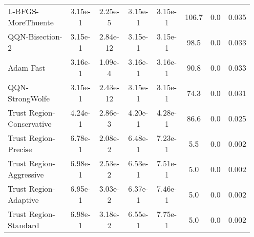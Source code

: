 \documentclass{article}
\begin{document}
\begin{table}[htbp]
{\begin{tabular}{p{2.5cm}*{7}{c}}
L-BFGS-MoreThuente & 3.15e-1 & 2.25e-5 & 3.15e-1 & 3.15e-1 & 106.7 & 0.0 & 0.035 \\
QQN-Bisection-2 & 3.15e-1 & 2.84e-12 & 3.15e-1 & 3.15e-1 & 98.5 & 0.0 & 0.033 \\
Adam-Fast & 3.16e-1 & 1.09e-4 & 3.16e-1 & 3.16e-1 & 90.8 & 0.0 & 0.033 \\
QQN-StrongWolfe & 3.15e-1 & 2.43e-12 & 3.15e-1 & 3.15e-1 & 74.3 & 0.0 & 0.031 \\
Trust Region-Conservative & 4.24e-1 & 2.86e-3 & 4.20e-1 & 4.28e-1 & 86.6 & 0.0 & 0.025 \\
Trust Region-Precise & 6.78e-1 & 2.08e-2 & 6.48e-1 & 7.23e-1 & 5.5 & 0.0 & 0.002 \\
Trust Region-Aggressive & 6.98e-1 & 2.53e-2 & 6.53e-1 & 7.51e-1 & 5.0 & 0.0 & 0.002 \\
Trust Region-Adaptive & 6.95e-1 & 3.03e-2 & 6.37e-1 & 7.46e-1 & 5.0 & 0.0 & 0.002 \\
Trust Region-Standard & 6.98e-1 & 3.18e-2 & 6.55e-1 & 7.75e-1 & 5.0 & 0.0 & 0.002 \\
\bottomrule
\end{tabular}
}
\end{table}
\end{document}
